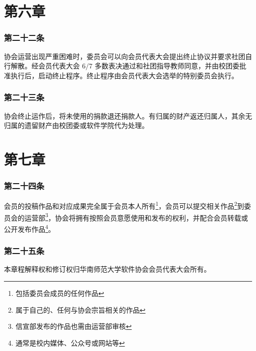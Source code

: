 \documentclass[
]{ctexart}
\begin{document}
\hypertarget{ux7b2cux516dux7ae0-ux7ec8ux6b62ux7a0bux5e8f}{%
\section{第六章}\label{ux7b2cux516dux7ae0-ux7ec8ux6b62ux7a0bux5e8f}}

\hypertarget{ux7b2cux4e8cux5341ux4e00ux6761-ux7ec8ux6b62ux6761ux4ef6}{%
\subsubsection{第二十二条}\label{ux7b2cux4e8cux5341ux4e00ux6761-ux7ec8ux6b62ux6761ux4ef6}}

协会运营出现严重困难时，委员会可以向会员代表大会提出终止协议并要求社团自行解散。经会员代表大会
\(6/7\)
多数表决通过和社团指导教师同意，并由校团委批准执行后，启动终止程序。终止程序由会员代表大会选举的特别委员会执行。

\hypertarget{ux7b2cux4e8cux5341ux4e8cux6761-ux7ec8ux6b62ux540eux8d22ux4ea7ux5904ux7406}{%
\subsubsection{第二十三条}\label{ux7b2cux4e8cux5341ux4e8cux6761-ux7ec8ux6b62ux540eux8d22ux4ea7ux5904ux7406}}

协会终止运作后，将未使用的捐款退还捐款人。有归属的财产返还归属人，其余无归属的遗留财产由校团委或软件学院代为处理。

\hypertarget{ux7b2cux4e03ux7ae0-ux9644ux5219}{%
\section{第七章}\label{ux7b2cux4e03ux7ae0-ux9644ux5219}}

\hypertarget{ux7b2cux516dux6761-ux6838ux5fc3ux4f1aux5458}{%
\subsubsection{第二十四条}\label{ux7b2cux516dux6761-ux6838ux5fc3ux4f1aux5458}}

会员的投稿作品和对应成果完全属于会员本人所有\footnote{包括委员会成员的任何作品}，会员可以提交相关作品\footnote{属于自己的、任何与协会宗旨相关的作品}到委员会的运营部\footnote{信宣部发布的作品也需由运营部审核}，协会将拥有按照会员意愿使用和发布的权利，并配合会员转载或公开发布作品\footnote{通常是校内媒体、公众号或网站等}。

\hypertarget{ux7b2cux4e8cux5341ux4e09ux6761-ux5173ux4e8eux672cux7ae0ux7a0b}{%
\subsubsection{第二十五条}\label{ux7b2cux4e8cux5341ux4e09ux6761-ux5173ux4e8eux672cux7ae0ux7a0b}}

本章程解释权和修订权归华南师范大学软件协会会员代表大会所有。
\end{document}
